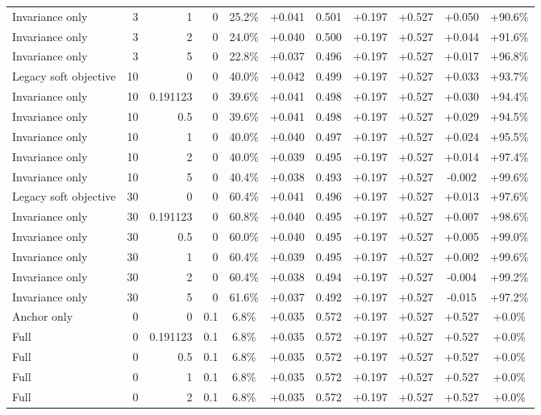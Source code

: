 \begin{table}[htbp]
\begin{tabular}{lrrrccccccc}
Invariance only & 3 & 1 & 0 & 25.2\% & +0.041 & 0.501 & +0.197 & +0.527 & +0.050 & +90.6\% \\
Invariance only & 3 & 2 & 0 & 24.0\% & +0.040 & 0.500 & +0.197 & +0.527 & +0.044 & +91.6\% \\
Invariance only & 3 & 5 & 0 & 22.8\% & +0.037 & 0.496 & +0.197 & +0.527 & +0.017 & +96.8\% \\
Legacy soft objective & 10 & 0 & 0 & 40.0\% & +0.042 & 0.499 & +0.197 & +0.527 & +0.033 & +93.7\% \\
Invariance only & 10 & 0.191123 & 0 & 39.6\% & +0.041 & 0.498 & +0.197 & +0.527 & +0.030 & +94.4\% \\
Invariance only & 10 & 0.5 & 0 & 39.6\% & +0.041 & 0.498 & +0.197 & +0.527 & +0.029 & +94.5\% \\
Invariance only & 10 & 1 & 0 & 40.0\% & +0.040 & 0.497 & +0.197 & +0.527 & +0.024 & +95.5\% \\
Invariance only & 10 & 2 & 0 & 40.0\% & +0.039 & 0.495 & +0.197 & +0.527 & +0.014 & +97.4\% \\
Invariance only & 10 & 5 & 0 & 40.4\% & +0.038 & 0.493 & +0.197 & +0.527 & -0.002 & +99.6\% \\
Legacy soft objective & 30 & 0 & 0 & 60.4\% & +0.041 & 0.496 & +0.197 & +0.527 & +0.013 & +97.6\% \\
Invariance only & 30 & 0.191123 & 0 & 60.8\% & +0.040 & 0.495 & +0.197 & +0.527 & +0.007 & +98.6\% \\
Invariance only & 30 & 0.5 & 0 & 60.0\% & +0.040 & 0.495 & +0.197 & +0.527 & +0.005 & +99.0\% \\
Invariance only & 30 & 1 & 0 & 60.4\% & +0.039 & 0.495 & +0.197 & +0.527 & +0.002 & +99.6\% \\
Invariance only & 30 & 2 & 0 & 60.4\% & +0.038 & 0.494 & +0.197 & +0.527 & -0.004 & +99.2\% \\
Invariance only & 30 & 5 & 0 & 61.6\% & +0.037 & 0.492 & +0.197 & +0.527 & -0.015 & +97.2\% \\
Anchor only & 0 & 0 & 0.1 & 6.8\% & +0.035 & 0.572 & +0.197 & +0.527 & +0.527 & +0.0\% \\
Full & 0 & 0.191123 & 0.1 & 6.8\% & +0.035 & 0.572 & +0.197 & +0.527 & +0.527 & +0.0\% \\
Full & 0 & 0.5 & 0.1 & 6.8\% & +0.035 & 0.572 & +0.197 & +0.527 & +0.527 & +0.0\% \\
Full & 0 & 1 & 0.1 & 6.8\% & +0.035 & 0.572 & +0.197 & +0.527 & +0.527 & +0.0\% \\
Full & 0 & 2 & 0.1 & 6.8\% & +0.035 & 0.572 & +0.197 & +0.527 & +0.527 & +0.0\% \\

\end{tabular}
\end{table}
